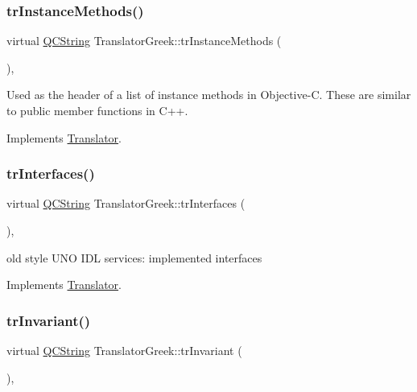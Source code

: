 \subsubsection{\texorpdfstring{trInstanceMethods()}{trInstanceMethods()}}
{\footnotesize\ttfamily virtual \mbox{\hyperlink{class_q_c_string}{Q\+C\+String}} Translator\+Greek\+::tr\+Instance\+Methods (\begin{DoxyParamCaption}{ }\end{DoxyParamCaption})\hspace{0.3cm}{\ttfamily [inline]}, {\ttfamily [virtual]}}

Used as the header of a list of instance methods in Objective-\/C. These are similar to public member functions in C++. 

Implements \mbox{\hyperlink{class_translator}{Translator}}.

\mbox{\label{class_translator_greek_a686a44a233660607aac5b9018a666645}} 
\subsubsection{\texorpdfstring{trInterfaces()}{trInterfaces()}}
{\footnotesize\ttfamily virtual \mbox{\hyperlink{class_q_c_string}{Q\+C\+String}} Translator\+Greek\+::tr\+Interfaces (\begin{DoxyParamCaption}{ }\end{DoxyParamCaption})\hspace{0.3cm}{\ttfamily [inline]}, {\ttfamily [virtual]}}

old style U\+NO I\+DL services\+: implemented interfaces 

Implements \mbox{\hyperlink{class_translator}{Translator}}.

\mbox{\label{class_translator_greek_afc20af712ce07a81c1ec4fbcb5660b50}} 
\subsubsection{\texorpdfstring{trInvariant()}{trInvariant()}}
{\footnotesize\ttfamily virtual \mbox{\hyperlink{class_q_c_string}{Q\+C\+String}} Translator\+Greek\+::tr\+Invariant (\begin{DoxyParamCaption}{ }\end{DoxyParamCaption})\hspace{0.3cm}{\ttfamily [inline]}, {\ttfamily [virtual]}}

